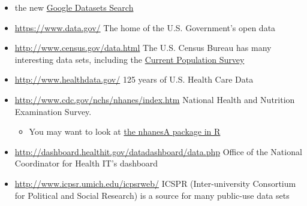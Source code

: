 \documentclass[]{book}
\providecommand{\tightlist}{%
  \setlength{\itemsep}{0pt}\setlength{\parskip}{0pt}}
\theoremstyle{definition}
\theoremstyle{definition}
\theoremstyle{definition}
\theoremstyle{remark}
\begin{document}
\begin{itemize}
\tightlist
\item
  the new \href{https://toolbox.google.com/datasetsearch}{Google
  Datasets Search}
\item
  \url{https://www.data.gov/} The home of the U.S. Government's open
  data
\item
  \url{http://www.census.gov/data.html} The U.S. Census Bureau has many
  interesting data sets, including the
  \href{http://www.census.gov/programs-surveys/cps.html}{Current
  Population Survey}
\item
  \url{http://www.healthdata.gov/} 125 years of U.S. Health Care Data
\item
  \url{http://www.cdc.gov/nchs/nhanes/index.htm} National Health and
  Nutrition Examination Survey.

  \begin{itemize}
  \tightlist
  \item
    You may want to look at
    \href{https://cran.r-project.org/web/packages/nhanesA/vignettes/Introducing_nhanesA.html}{the
    nhanesA package in R}
  \end{itemize}
\item
  \url{http://dashboard.healthit.gov/datadashboard/data.php} Office of
  the National Coordinator for Health IT's dashboard
\item
  \url{http://www.icpsr.umich.edu/icpsrweb/} ICSPR (Inter-university
  Consortium for Political and Social Research) is a source for many
  public-use data sets


\end{itemize}
\end{document}
